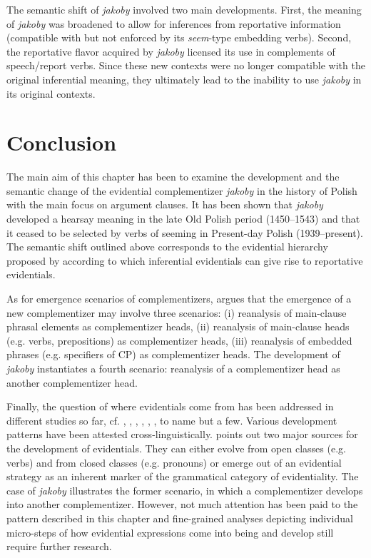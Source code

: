 \documentclass[output=paper]{langsci/langscibook}
\begin{document}
\noindent The semantic shift of \emph{jakoby} involved two main developments. First, the meaning of \emph{jakoby} was broadened to allow for inferences from reportative information (compatible with but not enforced by its \emph{seem}-type embedding verbs). Second, the reportative flavor acquired by \emph{jakoby} licensed its use in complements of speech\slash report verbs. Since these new contexts were no longer compatible with the original inferential meaning, they ultimately lead to the inability to use \emph{jakoby} in its original contexts.

\section{Conclusion}\label{sec:jakoby:5}

The main aim of this chapter has been to examine the development and the semantic change of the evidential complementizer \emph{jakoby} in the history of Polish with the main focus on argument clauses. It has been shown that \emph{jakoby} developed a hearsay meaning in the late Old Polish period (1450--1543) and that it  ceased to be selected by verbs of seeming in Present-day Polish (1939--present). The semantic shift outlined above corresponds to the evidential hierarchy proposed by \textcite{Haan1999} according to which inferential evidentials can give rise to reportative evidentials.

As for emergence scenarios of complementizers, \textcite[433]{Willis2007} argues that the emergence of a new complementizer may involve three scenarios: (i) reanalysis of main-clause phrasal elements as complementizer heads, (ii) reanalysis of main-clause heads (e.g. verbs, prepositions) as complementizer heads, (iii) reanalysis of embedded phrases (e.g. specifiers of CP) as complementizer heads. The development of \emph{jakoby} instantiates a fourth scenario: reanalysis of a complementizer head as another complementizer head.

Finally, the question of where evidentials come from has been addressed in different studies so far, cf. \textcite{Willett1988}, \textcite{Lazard2001}, \textcite[271--302]{Aikhenvald2004}, \textcite{Aikhenvald2011}, \textcite{Jalava2017}, \textcite{Friedman2018}, to name but a few. Various development patterns have been attested cross-linguistically. \textcite{Aikhenvald2011} points out two major sources for the development of evidentials. They can either evolve from open classes (e.g. verbs) and from closed classes (e.g. pronouns) or emerge out of an evidential  strategy as an inherent marker of the grammatical category of evidentiality. The case of \emph{jakoby} illustrates the former scenario, in which a complementizer develops into another complementizer. However, not much attention has been paid to the pattern described in this chapter and fine-grained analyses depicting individual micro-steps of how evidential expressions come into being and develop still require further research.
\end{document}
